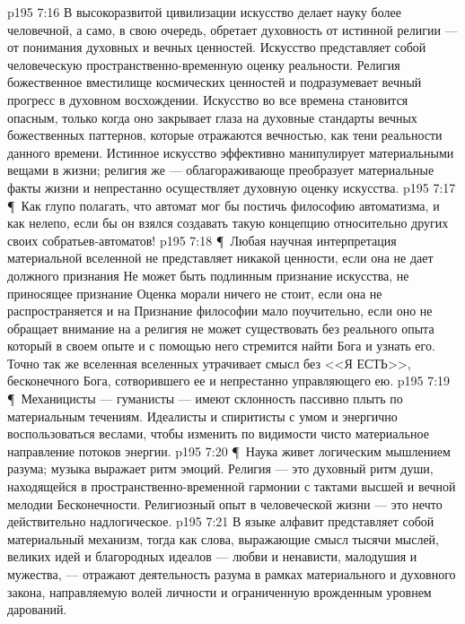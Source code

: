 \vs p195 7:16 В высокоразвитой цивилизации искусство делает науку более человечной, а само, в свою очередь, обретает духовность от истинной религии --- от понимания духовных и вечных ценностей. Искусство представляет собой человеческую пространственно\hyp{}временную оценку реальности. Религия  божественное вместилище космических ценностей и подразумевает вечный прогресс в духовном восхождении. Искусство во все времена становится опасным, только когда оно закрывает глаза на духовные стандарты вечных божественных паттернов, которые отражаются вечностью, как тени реальности данного времени. Истинное искусство эффективно манипулирует материальными вещами в жизни; религия же --- облагораживающе преобразует материальные факты жизни и непрестанно осуществляет духовную оценку искусства.
\vs p195 7:17 \P\ Как глупо полагать, что автомат мог бы постичь философию автоматизма, и как нелепо, если бы он взялся создавать такую концепцию относительно других своих собратьев\hyp{}автоматов!
\vs p195 7:18 \P\ Любая научная интерпретация материальной вселенной не представляет никакой ценности, если она не дает должного признания  Не может быть подлинным признание искусства, не приносящее признание  Оценка морали ничего не стоит, если она не распространяется и на  Признание философии мало поучительно, если оно не обращает внимание на  а религия не может существовать без реального опыта  который в своем опыте и с помощью него стремится найти Бога и узнать его. Точно так же вселенная вселенных утрачивает смысл без <<Я ЕСТЬ>>, бесконечного Бога, сотворившего ее и непрестанно управляющего ею.
\vs p195 7:19 \P\ Механицисты --- гуманисты --- имеют склонность пассивно плыть по материальным течениям. Идеалисты и спиритисты  с умом и энергично воспользоваться веслами, чтобы изменить по видимости чисто материальное направление потоков энергии.
\vs p195 7:20 \P\ Наука живет логическим мышлением разума; музыка выражает ритм эмоций. Религия --- это духовный ритм души, находящейся в пространственно\hyp{}временной гармонии с тактами высшей и вечной мелодии Бесконечности. Религиозный опыт в человеческой жизни --- это нечто действительно надлогическое.
\vs p195 7:21 В языке алфавит представляет собой материальный механизм, тогда как слова, выражающие смысл тысячи мыслей, великих идей и благородных идеалов --- любви и ненависти, малодушия и мужества, --- отражают деятельность разума в рамках материального и духовного закона, направляемую волей личности и ограниченную врожденным уровнем дарований.
